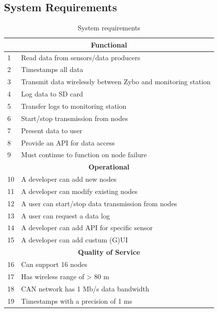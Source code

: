 \subsection{System Requirements} %
\label{sec:system_requirements}

\begin{table}[H]
\centering
\caption{System requirements}
\label{tab:requirements}

\begin{tabular}{ |p{0.3cm}|p{10.5cm}| }
\hline
\multicolumn{2}{|c|}{\textbf{Functional}}\\
\hline
1 & Read data from sensors/data producers 				\\
2 & Timestamps all data 								\\
3 & Transmit data wirelessly between Zybo and monitoring station	\\
4 & Log data to SD card 								\\
5 & Transfer logs to monitoring station 								\\
6 & Start/stop transmission from nodes 					\\
7 & Present data to user								\\
8 & Provide an API for data access						\\
9 & Must continue to function on node failure			\\

\hline
\multicolumn{2}{|c|}{\textbf{Operational}}\\
\hline	
10 & A developer can add new nodes 										 \\
11 & A developer can modify existing nodes 								 \\
12 & A user can start/stop data transmission from nodes					 \\
13 & A user can request a data log 										 \\
14 & A developer can add API for specific sensor 						 \\
15 & A developer can add custum (G)UI									 \\


\hline
\multicolumn{2}{|c|}{\textbf{Quality of Service}}\\
\hline	
16 & Can support 16 nodes							 					\\
17 & Has wireless range of > 80 m						 				\\
18 & CAN network has 1 Mb/s data bandwidth			 					\\
19 & Timestamps with a precision of 1 ms 			 					\\


\end{tabular}
\end{table}

